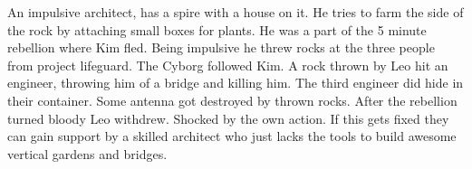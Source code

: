 \begin{npcBox}[title=Leo]
    \begin{stressSection}
    \end{stressSection}
    \begin{tabularx}{\textwidth}{ XX }
    \end{tabularx}
    
    \begin{consequences}
    \item {}
    \item {}
    \item {}
    \end{consequences}
    
    \begin{npcDescription}
    An impulsive architect, has a spire with a house on it. He tries to farm the side of the rock by attaching small boxes for plants.
    He was a part of the 5 minute rebellion where Kim fled. Being impulsive he threw rocks at the three people from project lifeguard. The Cyborg followed Kim. A rock thrown by Leo hit an engineer, throwing him of a bridge and killing him. The third engineer did hide in their container. Some antenna got destroyed by thrown rocks.
    After the rebellion turned bloody Leo withdrew. Shocked by the own action.
    If this gets fixed they can gain support by a skilled architect who just lacks the tools to build awesome vertical gardens and bridges.
    \end{npcDescription}
    
\end{npcBox}


